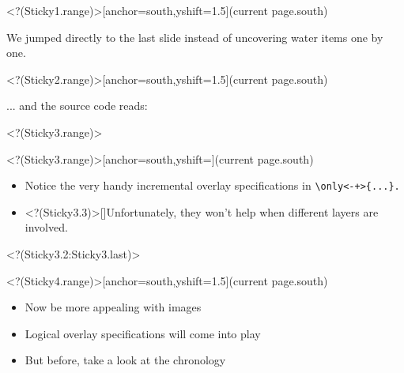 \Sticky<?(Sticky1.range)>[anchor=south,yshift=1.5\baselineskip](current page.south){\bfseries\begin{minipage}{0.66\textwidth} We jumped directly to the last slide
instead of uncovering water items one by one.\end{minipage}}
\Sticky<?(Sticky2.range)>[anchor=south,yshift=1.5\baselineskip](current page.south){\bfseries\begin{minipage}{0.66\textwidth} ... and the source code reads:\end{minipage}}
\visible<?(Sticky3.range)>{
\Sticky<?(Sticky3.range)>[anchor=south,yshift=\baselineskip](current page.south){\bfseries\begin{minipage}{0.9\textwidth}
\begin{itemize}
\item [\myBulb]Notice the very handy incremental overlay specifications in
%
\texttt{\color{MyGreen}\backslash only<-+>\{...\}.%
}
\item<?(Sticky3.3)>[\myBulb]Unfortunately, they won't help when different layers are involved.
\end{itemize}
\end{minipage}
}}
\only<?(Sticky3.2:Sticky3.last)>{
}

%
\Sticky<?(Sticky4.range)>[anchor=south,yshift=1.5\baselineskip](current page.south){\bfseries\begin{minipage}{0.7\textwidth}
\begin{itemize}[<?(Sticky4++)->]
\item[\myBulb] Now be more appealing with images
\item[\myBulb] Logical overlay specifications will come into play
\item[\myBulb] But before, take a look at the chronology
\end{itemize}
\end{minipage}
}
